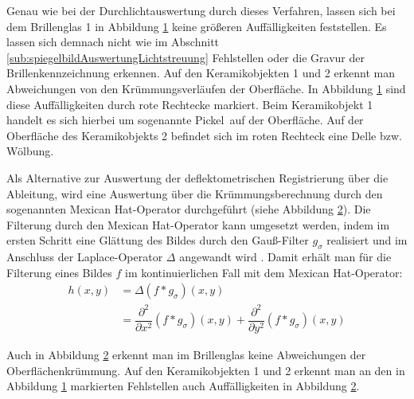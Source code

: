 {
	\begin{figure}[H]
		\centering
		
		\label{tikz:abbAbleitungRegistrierungSpiegel}
	\end{figure}
}

\noindent
Genau wie bei der Durchlichtauswertung durch dieses Verfahren, lassen sich bei dem Brillenglas 1 in Abbildung \ref{tikz:abbAbleitungRegistrierungSpiegel} keine größeren Auffälligkeiten feststellen.
Es lassen sich demnach nicht wie im Abschnitt \ref{sub:spiegelbildAuswertungLichtstreuung} Fehlstellen oder die Gravur der Brillenkennzeichnung erkennen.
Auf den Keramikobjekten 1 und 2 erkennt man Abweichungen von den Krümmungsverläufen der Oberfläche.
In Abbildung \ref{tikz:abbAbleitungRegistrierungSpiegel} sind diese Auffälligkeiten durch rote Rechtecke markiert.
Beim Keramikobjekt 1 handelt es sich hierbei um sogenannte  \glqq Pickel\grqq ~auf der Oberfläche.
Auf der Oberfläche des Keramikobjekts 2 befindet sich im roten Rechteck eine Delle bzw. Wölbung.

\p
Als Alternative zur Auswertung der deflektometrischen Registrierung über die Ableitung, wird eine Auswertung über die Krümmungsberechnung durch den sogenannten \glqq Mexican Hat\grqq -Operator durchgeführt (siehe Abbildung \ref{tikz:abbMexicanHatRegistrierung}).
Die Filterung durch den \glqq Mexican Hat\grqq -Operator kann umgesetzt werden, indem im ersten Schritt eine Glättung des Bildes durch den Gauß-Filter $g_\sigma$ realisiert und im Anschluss der Laplace-Operator $\Delta$ angewandt wird \cite{mexicanHat}.
Damit erhält man für die Filterung eines Bildes $f$ im kontinuierlichen Fall mit dem \glqq Mexican Hat\grqq -Operator:
%
\begin{equation*}
	\begin{split}
		h(x,y) &= \Delta(f \ast g_\sigma)(x,y) \\
		&= \dfrac{\partial^2}{\partial x^2} (f \ast g_\sigma)(x,y) + \dfrac{\partial^2}{\partial y^2} (f \ast g_\sigma)(x,y)
	\end{split}
\end{equation*}

{
	\begin{figure}[H]
		\centering
		
		\label{tikz:abbMexicanHatRegistrierung}
	\end{figure}
}

\noindent
Auch in Abbildung \ref{tikz:abbMexicanHatRegistrierung} erkennt man im Brillenglas keine Abweichungen der Oberflächen\-krümmung.
Auf den Keramikobjekten 1 und 2 erkennt man an den in Abbildung \ref{tikz:abbAbleitungRegistrierungSpiegel} markierten Fehlstellen auch Auffälligkeiten in Abbildung \ref{tikz:abbMexicanHatRegistrierung}.